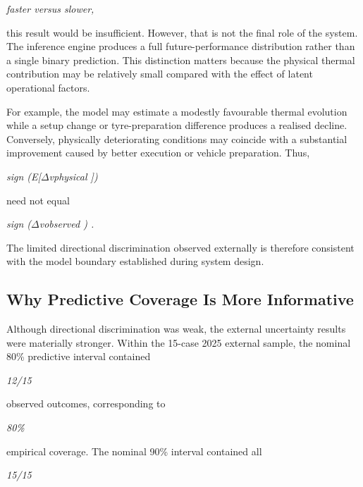 \begin{center}\textit{faster   versus     slower,}\end{center}

this result would be insufficient. However, that is not the final role of the system. The inference engine produces a full future-performance distribution rather than a single binary prediction. This distinction matters because the physical thermal contribution may be relatively small compared with the effect of latent operational factors.

For example, the model may estimate a modestly favourable thermal evolution while a setup change or tyre-preparation difference produces a realised decline. Conversely, physically deteriorating conditions may coincide with a substantial improvement caused by better execution or vehicle preparation. Thus,

\begin{center}\textit{sign (E[\ensuremath{\Delta}vphysical ])}\end{center}

need not equal

\begin{center}\textit{sign (\ensuremath{\Delta}vobserved ) .}\end{center}

The limited directional discrimination observed externally is therefore consistent with the model boundary established during system design.

\subsection{Why Predictive Coverage Is More Informative}
Although directional discrimination was weak, the external uncertainty results were materially stronger. Within the 15-case 2025 external sample, the nominal 80\% predictive interval contained

\begin{center}\textit{12/15}\end{center}

observed outcomes, corresponding to

\begin{center}\textit{80\%}\end{center}

empirical coverage. The nominal 90\% interval contained all

\begin{center}\textit{15/15}\end{center}

